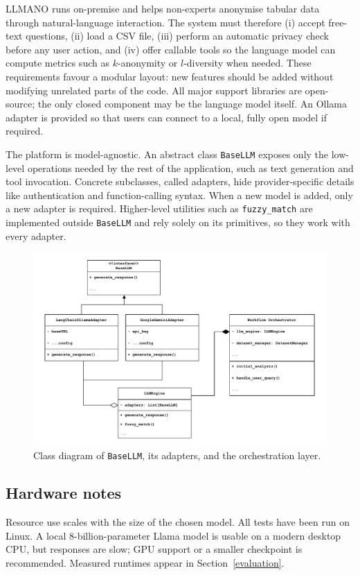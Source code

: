 \documentclass{article}
\begin{document}
LLMANO runs on-premise and helps non-experts anonymise tabular data through natural-language interaction.  
The system must therefore (i) accept free-text questions, (ii) load a CSV file, (iii) perform an automatic privacy check before any user action, and (iv) offer callable tools so the language model can compute metrics such as $k$-anonymity or $l$-diversity when needed.  
These requirements favour a modular layout: new features should be added without modifying unrelated parts of the code.  
All major support libraries are open-source; the only closed component may be the language model itself.  
An Ollama adapter is provided so that users can connect to a local, fully open model if required.

The platform is model-agnostic.  
An abstract class \texttt{BaseLLM} exposes only the low-level operations needed by the rest of the application, such as text generation and tool invocation.  
Concrete subclasses, called adapters, hide provider-specific details like authentication and function-calling syntax.  
When a new model is added, only a new adapter is required.  
Higher-level utilities such as \texttt{fuzzy\_match} are implemented outside \texttt{BaseLLM} and rely solely on its primitives, so they work with every adapter.

\begin{figure}[h]
    \centering
    \includegraphics[width=0.8\linewidth]{images/class_diagram.pdf}
    \caption{Class diagram of \texttt{BaseLLM}, its adapters, and the orchestration layer.}
    \label{fig:class-diagram}
\end{figure}

\subsection{Hardware notes}

Resource use scales with the size of the chosen model.  
All tests have been run on Linux.  
A local 8-billion-parameter Llama model is usable on a modern desktop CPU, but responses are slow; GPU support or a smaller checkpoint is recommended.  
Measured runtimes appear in Section~\ref{evaluation}.
\end{document}
